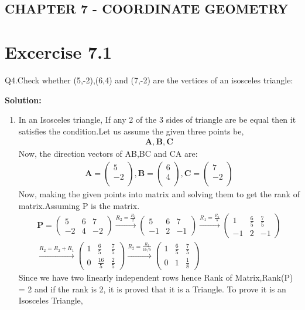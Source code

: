 \documentclass[12pt]{article}
\newcommand{\solution}{\noindent \textbf{Solution: }}
\newcommand{\myvec}[1]{\ensuremath{\begin{pmatrix}#1\end{pmatrix}}}
\let\vec\mathbf
\begin{document}
\begin{center}
\section*{CHAPTER 7 - COORDINATE GEOMETRY}

\end{center}
\section*{Excercise 7.1}

Q4.Check whether (5,-2),(6,4) and (7,-2) are the vertices of an isosceles triangle:

\solution
\begin{enumerate}
\item In an Isosceles triangle, If any 2 of the 3 sides of  triangle are be equal then it satisfies the condition.Let us assume the given three points be,
	\begin{align}
\vec{A} , \vec{B} , \vec{C}
	\end{align}
Now, the direction vectors of AB,BC and CA are:
	\begin{align}
	\vec{A} = \myvec{
	    5\\
	   -2\\
		},
	\vec{B} = \myvec{
	    6\\
		4\\
		},
	\vec{C} = \myvec{
		7\\
	   -2\\
	    }
	\end{align}  
Now, making the given points into matrix and solving them to get the rank of matrix.Assuming P is the matrix.
	\begin{align}
\vec{P} = \myvec{
5&6&7\\
-2&4&-2
}\xrightarrow[]{R_2=\frac{R_2}{2}}
\myvec{
5&6&7\\
-1&2&-1
}\xrightarrow[]{R_1=\frac{R_1}{5}}
\myvec{
1&\frac{6}{5}&\frac{7}{5}\\
-1&2&-1
}\\\xrightarrow[]{R_2=R_2+R_1}
\myvec{
1&\frac{6}{5}&\frac{7}{5}\\
0&\frac{16}{5}&\frac{2}{5}
}\xrightarrow[]{R_2=\frac{R_2}{16/5}}
\myvec{
1&\frac{6}{5}&\frac{7}{5}\\
0&1&\frac{1}{8}
}
	\end{align}
Since we have two linearly independent rows hence Rank of Matrix,Rank(P) = 2 and if the rank is 2, it is proved that it is a Triangle. To prove it is an Isosceles Triangle,

\end{enumerate}
\end{document}
